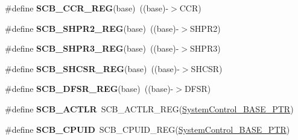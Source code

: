 \begin{DoxyCompactItemize}
\item 
\mbox{\label{group___s_c_b___register___accessor___macros_ga33158444a24538a7a5aaff86d3153c01}} 
\#define {\bfseries S\+C\+B\+\_\+\+C\+C\+R\+\_\+\+R\+EG}(base)~((base)-\/$>$C\+CR)
\item 
\mbox{\label{group___s_c_b___register___accessor___macros_ga870a0e7eedd2b8fd1969f840dbb84f81}} 
\#define {\bfseries S\+C\+B\+\_\+\+S\+H\+P\+R2\+\_\+\+R\+EG}(base)~((base)-\/$>$S\+H\+P\+R2)
\item 
\mbox{\label{group___s_c_b___register___accessor___macros_gaf6dad7136278c0fa61ad2d311352759b}} 
\#define {\bfseries S\+C\+B\+\_\+\+S\+H\+P\+R3\+\_\+\+R\+EG}(base)~((base)-\/$>$S\+H\+P\+R3)
\item 
\mbox{\label{group___s_c_b___register___accessor___macros_ga0d71167ab5249f469e9325fcde0e9e64}} 
\#define {\bfseries S\+C\+B\+\_\+\+S\+H\+C\+S\+R\+\_\+\+R\+EG}(base)~((base)-\/$>$S\+H\+C\+SR)
\item 
\mbox{\label{group___s_c_b___register___accessor___macros_ga0a463e0b75b661fabeedb3c26e0d240a}} 
\#define {\bfseries S\+C\+B\+\_\+\+D\+F\+S\+R\+\_\+\+R\+EG}(base)~((base)-\/$>$D\+F\+SR)
\item 
\mbox{\label{group___s_c_b___register___accessor___macros_ga2a94c61032c2b326d148f402585f66f4}} 
\#define {\bfseries S\+C\+B\+\_\+\+A\+C\+T\+LR}~S\+C\+B\+\_\+\+A\+C\+T\+L\+R\+\_\+\+R\+EG(\hyperlink{group___s_c_b___peripheral_gaf22864785770f832103e904244e078cb}{System\+Control\+\_\+\+B\+A\+S\+E\+\_\+\+P\+TR})
\item 
\mbox{\label{group___s_c_b___register___accessor___macros_gad6f841a4188701c78b4fbefc4dcd1cb6}} 
\#define {\bfseries S\+C\+B\+\_\+\+C\+P\+U\+ID}~S\+C\+B\+\_\+\+C\+P\+U\+I\+D\+\_\+\+R\+EG(\hyperlink{group___s_c_b___peripheral_gaf22864785770f832103e904244e078cb}{System\+Control\+\_\+\+B\+A\+S\+E\+\_\+\+P\+TR})
\item 
\mbox{\label{group___s_c_b___register___accessor___macros_ga7f8564488243827944de74c4db24b732}} 

\end{DoxyCompactItemize}
